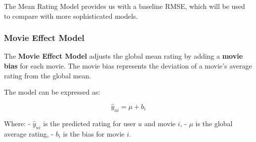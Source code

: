 \documentclass[
]{article}
\newenvironment{Shaded}{}{}
\newcommand{\AttributeTok}[1]{\textcolor[rgb]{0.49,0.56,0.16}{#1}}
\newcommand{\CommentTok}[1]{\textcolor[rgb]{0.38,0.63,0.69}{\textit{#1}}}
\newcommand{\FunctionTok}[1]{\textcolor[rgb]{0.02,0.16,0.49}{#1}}
\newcommand{\NormalTok}[1]{#1}
\newcommand{\OtherTok}[1]{\textcolor[rgb]{0.00,0.44,0.13}{#1}}
\newcommand{\SpecialCharTok}[1]{\textcolor[rgb]{0.25,0.44,0.63}{#1}}
\newcommand{\StringTok}[1]{\textcolor[rgb]{0.25,0.44,0.63}{#1}}
\begin{document}
The Mean Rating Model provides us with a baseline RMSE, which will be
used to compare with more sophisticated models.

\subsubsection{Movie Effect Model}\label{movie-effect-model}

The \textbf{Movie Effect Model} adjusts the global mean rating by adding
a \textbf{movie bias} for each movie. The movie bias represents the
deviation of a movie's average rating from the global mean.

The model can be expressed as:

\[
\hat{y}_{ui} = \mu + b_i
\]

Where: - \(\hat{y}_{ui}\) is the predicted rating for user \(u\) and
movie \(i\), - \(\mu\) is the global average rating, - \(b_i\) is the
bias for movie \(i\).

\begin{Shaded}
\end{Shaded}
\end{document}
